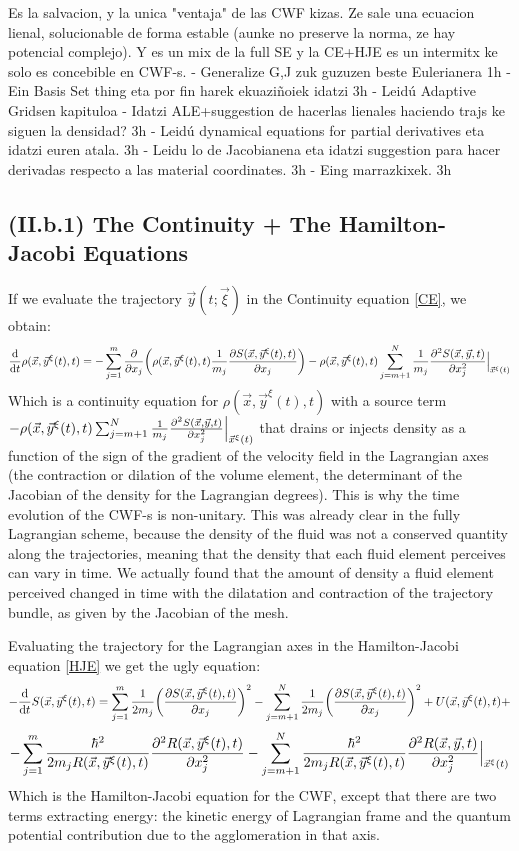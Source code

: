 \documentclass[11pt, a4paper]{article} %
\begin{document}
Es la salvacion, y la unica "ventaja" de las CWF kizas. Ze sale una ecuacion lienal, solucionable de forma estable (aunke no preserve la norma, ze hay potencial complejo). Y es un mix de la full SE y la CE+HJE es un intermitx ke solo es concebible en CWF-s.
- Generalize G,J zuk guzuzen beste Eulerianera 1h
- Ein Basis Set thing eta por fin harek ekuaziñoiek idatzi 3h
- Leidú Adaptive Gridsen kapituloa 
- Idatzi ALE+suggestion de hacerlas lienales haciendo trajs ke siguen la densidad? 3h
- Leidú dynamical equations for partial derivatives eta idatzi euren atala. 3h
- Leidu lo de Jacobianena eta idatzi suggestion para hacer derivadas respecto a las material coordinates. 3h
- Eing marrazkixek. 3h


\subsection*{(II.b.1) The Continuity + The Hamilton-Jacobi Equations}
If we evaluate the trajectory $\vec{y}(t;\vec{\xi})$ in the Continuity equation \eqref{CE}, we obtain:
\begin{equation}
\dv{}{t}\rho(\vec{x},\vec{y}^\xi(t),t)=-\sum_{j=1}^m\pdv{}{x_j}\qty(\rho(\vec{x}, \vec{y}^\xi(t), t) \frac{1}{m_j}\pdv{S(\vec{x}, \vec{y}^\xi(t), t)}{x_j}) - \rho(\vec{x}, \vec{y}^\xi(t),t) \sum_{j=m+1}^N \frac{1}{m_j}\pdv[2]{S(\vec{x}, \vec{y}, t)}{x_j}\Big\rvert_{\vec{x}^\xi(t)}
\end{equation}
Which is a continuity equation for $\rho(\vec{x},\vec{y}^\xi(t),t)$ with a source term $- \rho(\vec{x}, \vec{y}^\xi(t),t) \sum_{j=m+1}^N \frac{1}{m_j}\pdv[2]{S(\vec{x}, \vec{y}, t)}{x_j}\Big\rvert_{\vec{x}^\xi(t)}$ that drains or injects density as a function of the sign of the gradient of the velocity field in the Lagrangian axes (the contraction or dilation of the volume element, the determinant of the Jacobian of the density for the Lagrangian degrees). This is why the time evolution of the CWF-s is non-unitary. This was already clear in the fully Lagrangian scheme, because the density of the fluid was not a conserved quantity along the trajectories, meaning that the density that each fluid element perceives can vary in time. We actually found that the amount of density a fluid element perceived changed in time with the dilatation and contraction of the trajectory bundle, as given by the Jacobian of the mesh.

Evaluating the trajectory for the Lagrangian axes in the Hamilton-Jacobi equation \eqref{HJE} we get the ugly equation:
\begin{equation}
-\dv{}{t}S(\vec{x}, \vec{y}^\xi(t),t)=\sum_{j=1}^m\frac{1}{2m_j}\qty(\pdv{S(\vec{x},\vec{y}^\xi(t),t)}{x_j})^2-\sum_{j=m+1}^N\frac{1}{2m_j}\qty(\pdv{S(\vec{x},\vec{y}^\xi(t),t)}{x_j})^2+U(\vec{x},\vec{y}^\xi(t),t)+
\end{equation}
$$
-\sum_{j=1}^m \frac{\hbar^2}{2m_jR(\vec{x},\vec{y}^\xi(t),t)}\pdv[2]{R(\vec{x},\vec{y}^\xi(t),t)}{x_j}-\sum_{j=m+1}^N \frac{\hbar^2}{2m_jR(\vec{x},\vec{y}^\xi(t),t)}\pdv[2]{R(\vec{x},\vec{y},t)}{x_j}\Big\rvert_{\vec{x}^\xi(t)}
$$
Which is the Hamilton-Jacobi equation for the CWF, except that there are two terms extracting energy: the kinetic energy of Lagrangian frame and the quantum potential contribution due to the agglomeration in that axis.
\end{document}
